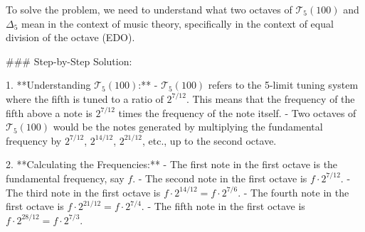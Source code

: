 To solve the problem, we need to understand what two octaves of \(\mathcal{T}_5(100)\) and \(\Delta_5\) mean in the context of music theory, specifically in the context of equal division of the octave (EDO).

### Step-by-Step Solution:

1. **Understanding \(\mathcal{T}_5(100)\):**
   - \(\mathcal{T}_5(100)\) refers to the 5-limit tuning system where the fifth is tuned to a ratio of \(2^{7/12}\). This means that the frequency of the fifth above a note is \(2^{7/12}\) times the frequency of the note itself.
   - Two octaves of \(\mathcal{T}_5(100)\) would be the notes generated by multiplying the fundamental frequency by \(2^{7/12}\), \(2^{14/12}\), \(2^{21/12}\), etc., up to the second octave.

2. **Calculating the Frequencies:**
   - The first note in the first octave is the fundamental frequency, say \(f\).
   - The second note in the first octave is \(f \cdot 2^{7/12}\).
   - The third note in the first octave is \(f \cdot 2^{14/12} = f \cdot 2^{7/6}\).
   - The fourth note in the first octave is \(f \cdot 2^{21/12} = f \cdot 2^{7/4}\).
   - The fifth note in the first octave is \(f \cdot 2^{28/12} = f \cdot 2^{7/3}\).
